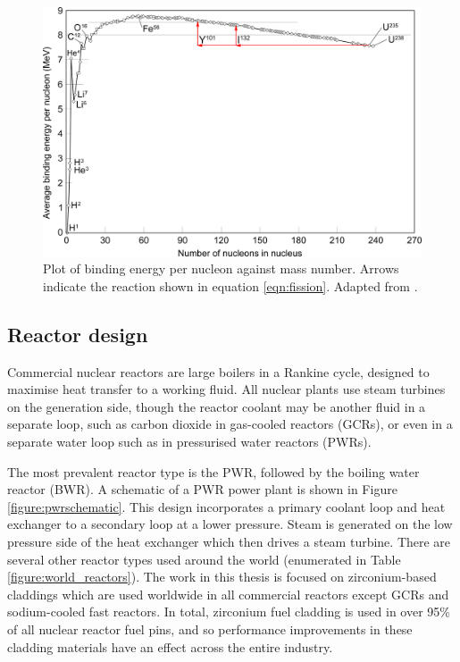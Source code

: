 \begin{figure}[ht]
\centering
\includegraphics[width=14cm]{images/Binding_energy_curve.png}
\caption[Plot of binding energy per nucleon against mass number. Arrows indicate the reaction shown in equation \ref{eqn:fission}.]{Plot of binding energy per nucleon against mass number. Arrows indicate the reaction shown in equation \ref{eqn:fission}. Adapted from \cite{Fastfission}.}
\label{figure:bindingenergy}
\end{figure}

\subsection{Reactor design} %

Commercial nuclear reactors are large boilers in a Rankine cycle, designed to maximise heat transfer to a working fluid. All nuclear plants use steam turbines on the generation side, though the reactor coolant may be another fluid in a separate loop, such as carbon dioxide in gas-cooled reactors (GCRs), or even in a separate water loop such as in pressurised water reactors (PWRs). 

The most prevalent reactor type is the PWR, followed by the boiling water reactor (BWR). A schematic of a PWR power plant is shown in Figure \ref{figure:pwrschematic}. This design incorporates a primary coolant loop and heat exchanger to a secondary loop at a lower pressure. Steam is generated on the low pressure side of the heat exchanger which then drives a steam turbine. There are several other reactor types used around the world (enumerated in Table \ref{figure:world_reactors}). The work in this thesis is focused on zirconium-based claddings which are used worldwide in all commercial reactors except GCRs and sodium-cooled fast reactors. In total, zirconium fuel cladding is used in over 95\% of all nuclear reactor fuel pins, and so performance improvements in these cladding materials have an effect across the entire industry.

